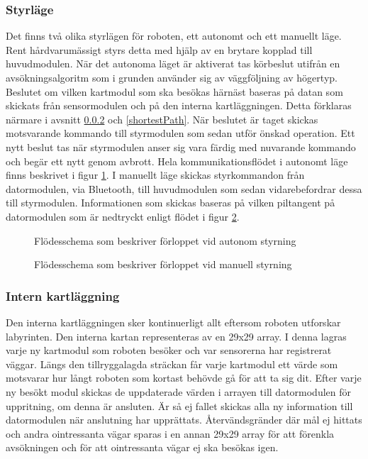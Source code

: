 \documentclass[11pt]{article}
\begin{document}
\begin{flushleft}
\subsubsection{Styrläge}
Det finns två olika styrlägen för roboten, ett autonomt och ett manuellt läge. Rent hårdvarumässigt styrs detta med hjälp av en brytare kopplad till huvudmodulen. När det autonoma läget är aktiverat tas körbeslut utifrån en avsökningsalgoritm som i grunden använder sig av väggföljning av högertyp. Beslutet om vilken kartmodul som ska besökas härnäst baseras på datan som skickats från sensormodulen och på den interna kartläggningen. Detta förklaras närmare i avsnitt \ref{search} och \ref{shortestPath}. När beslutet är taget skickas motsvarande kommando till styrmodulen som sedan utför önskad operation. Ett nytt beslut tas när styrmodulen anser sig vara färdig med nuvarande kommando och begär ett nytt genom avbrott. Hela kommunikationsflödet i autonomt läge finns beskrivet i figur \ref{autonomousMode}. I manuellt läge skickas styrkommandon från datormodulen, via Bluetooth\textsuperscript{\circledR}, till huvudmodulen som sedan vidarebefordrar dessa till styrmodulen. Informationen som skickas baseras på vilken piltangent på datormodulen som är nedtryckt enligt flödet i figur \ref{manualMode}.

\begin{figure}[htbp]
\centering
\noindent\resizebox{0.9\linewidth}{!}{
	}
	\cprotect\caption{Flödesschema som beskriver förloppet vid autonom styrning \label{autonomousMode}}	
\end{figure}

\begin{figure}[htbp]
\centering
\noindent\resizebox{0.9\linewidth}{!}{
	}
	\cprotect\caption{Flödesschema som beskriver förloppet vid manuell styrning \label{manualMode}}	
\end{figure}

\subsubsection{Intern kartläggning} \label{search}
Den interna kartläggningen sker kontinuerligt allt eftersom roboten utforskar labyrinten. Den interna kartan representeras av en 29x29 array. I denna lagras varje ny kartmodul som roboten besöker och var sensorerna har registrerat väggar. Längs den tillryggalagda sträckan får varje kartmodul ett värde som motsvarar hur långt roboten som kortast behövde gå för att ta sig dit. Efter varje ny besökt modul skickas de uppdaterade värden i arrayen till datormodulen för uppritning, om denna är ansluten. Är så ej fallet skickas alla ny information till datormodulen när anslutning har upprättats. Återvändsgränder där mål ej hittats och andra ointressanta vägar sparas i en annan 29x29 array för att förenkla avsökningen och för att ointressanta vägar ej ska besökas igen.


\end{flushleft}
\end{document}
